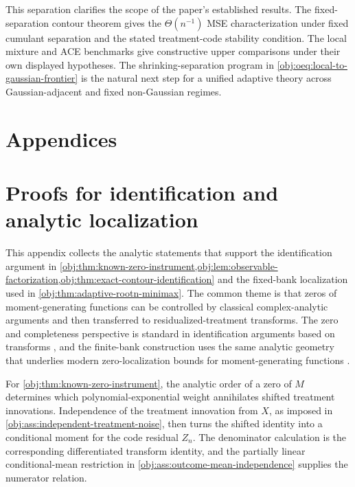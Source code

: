 \documentclass[11pt]{article}
\begin{document}
This separation clarifies the scope of the paper's established results. The fixed-separation contour theorem gives the \(\Theta(n^{-1})\) MSE characterization under fixed cumulant separation and the stated treatment-code stability condition. The local mixture and ACE benchmarks give constructive upper comparisons under their own displayed hypotheses. The shrinking-separation program in \cref{obj:oeq:local-to-gaussian-frontier} is the natural next step for a unified adaptive theory across Gaussian-adjacent and fixed non-Gaussian regimes.


\appendix

\section*{Appendices}

\section{Proofs for identification and analytic localization}

This appendix collects the analytic statements that support the identification argument in \cref{obj:thm:known-zero-instrument,obj:lem:observable-factorization,obj:thm:exact-contour-identification} and the fixed-bank localization used in \cref{obj:thm:adaptive-rootn-minimax}. The common theme is that zeros of moment-generating functions can be controlled by classical complex-analytic arguments and then transferred to residualized-treatment transforms. The zero and completeness perspective is standard in identification arguments based on transforms \citep{KaganLinnikRao1973,Mattner1992}, and the finite-bank construction uses the same analytic geometry that underlies modern zero-localization bounds for moment-generating functions \citep{MichelenSahasrabudhe2019,EremenkoFryntov2021,DinhGhoshTranTran2021}.

For \cref{obj:thm:known-zero-instrument}, the analytic order of a zero of \(M\) determines which polynomial-exponential weight annihilates shifted treatment innovations. Independence of the treatment innovation from \(X\), as imposed in \cref{obj:ass:independent-treatment-noise}, then turns the shifted identity into a conditional moment for the code residual \(Z_n\). The denominator calculation is the corresponding differentiated transform identity, and the partially linear conditional-mean restriction in \cref{obj:ass:outcome-mean-independence} supplies the numerator relation.
\end{document}
